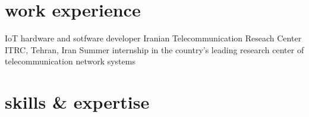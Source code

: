 \documentclass[]{friggeri-cv} %
\begin{document}

\section{work experience}

\begin{entrylist}

	{IoT hardware and sotfware developer}
	{Iranian Telecommunication Reseach Center ITRC, Tehran, Iran}
	{Summer internship in the country's leading research center of telecommunication network systems}
	
\end{entrylist}
\pagebreak


\section{skills \& expertise}
\end{document}

